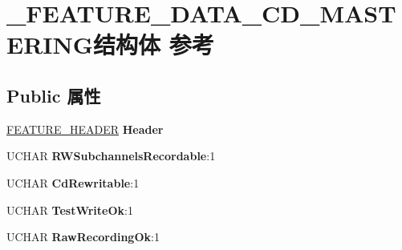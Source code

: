 \hypertarget{struct___f_e_a_t_u_r_e___d_a_t_a___c_d___m_a_s_t_e_r_i_n_g}{}\section{\+\_\+\+F\+E\+A\+T\+U\+R\+E\+\_\+\+D\+A\+T\+A\+\_\+\+C\+D\+\_\+\+M\+A\+S\+T\+E\+R\+I\+N\+G结构体 参考}
\label{struct___f_e_a_t_u_r_e___d_a_t_a___c_d___m_a_s_t_e_r_i_n_g}
\subsection*{Public 属性}
\begin{DoxyCompactItemize}
\item 
\mbox{\label{struct___f_e_a_t_u_r_e___d_a_t_a___c_d___m_a_s_t_e_r_i_n_g_a56a2fd0c3f6071d09b2e85ff472bce2d}} 
\hyperlink{struct___f_e_a_t_u_r_e___h_e_a_d_e_r}{F\+E\+A\+T\+U\+R\+E\+\_\+\+H\+E\+A\+D\+ER} {\bfseries Header}
\item 
\mbox{\label{struct___f_e_a_t_u_r_e___d_a_t_a___c_d___m_a_s_t_e_r_i_n_g_acdc217e54195ee8e0c5e51258a5ca910}} 
U\+C\+H\+AR {\bfseries R\+W\+Subchannels\+Recordable}\+:1
\item 
\mbox{\label{struct___f_e_a_t_u_r_e___d_a_t_a___c_d___m_a_s_t_e_r_i_n_g_ad4e809d664c050d3f1d9ad4818ffc690}} 
U\+C\+H\+AR {\bfseries Cd\+Rewritable}\+:1
\item 
\mbox{\label{struct___f_e_a_t_u_r_e___d_a_t_a___c_d___m_a_s_t_e_r_i_n_g_a28fc787454cb7bd1d576882854aa3cdd}} 
U\+C\+H\+AR {\bfseries Test\+Write\+Ok}\+:1
\item 
\mbox{\label{struct___f_e_a_t_u_r_e___d_a_t_a___c_d___m_a_s_t_e_r_i_n_g_a48a196c611a145dafe87c9b515546a36}} 
U\+C\+H\+AR {\bfseries Raw\+Recording\+Ok}\+:1
\item 
\mbox{\label{struct___f_e_a_t_u_r_e___d_a_t_a___c_d___m_a_s_t_e_r_i_n_g_ae5015ef0f27733b9460180f51b67c437}} 

\end{DoxyCompactItemize}
